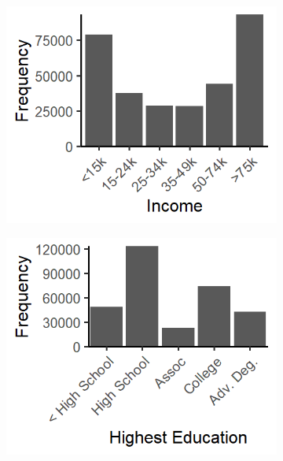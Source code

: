 \documentclass[12pt]{article}
\begin{document}
\begin{figure}[!ht]
\begin{subfigure}{.3\textwidth}
        \includegraphics[width=\textwidth]{supp-img/dens_income.png}
    \vspace{.5cm}
    \end{subfigure}
    \begin{subfigure}{.3\textwidth}
        \includegraphics[width=\textwidth]{supp-img/dens_educ.png}
    \end{subfigure}\hfill
    \begin{subfigure}{.3\textwidth}

\end{subfigure}
\end{figure}
\end{document}
